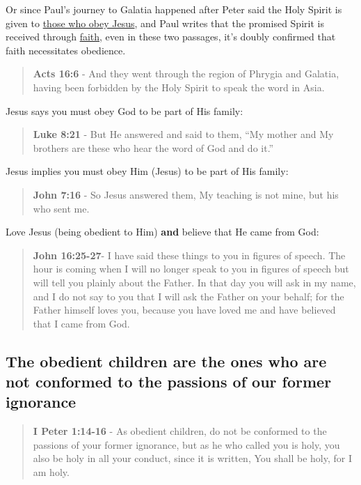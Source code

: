 \documentclass[11pt]{article}
\begin{document}
Or since Paul's journey to Galatia happened after Peter said the Holy Spirit is given to \uline{those who obey Jesus}, and Paul writes that the promised Spirit is received through \uline{faith}, even in these two passages, it's doubly confirmed that faith necessitates obedience.

\begin{quote}
\textbf{Acts 16:6} - And they went through the region of Phrygia and Galatia, having been forbidden by the Holy Spirit to speak the word in Asia.
\end{quote}

Jesus says you must obey God to be part of His family:

\begin{quote}
\textbf{Luke 8:21} - But He answered and said to them, “My mother and My brothers are these who hear the word of God and do it.”
\end{quote}

Jesus implies you must obey Him (Jesus) to be part of His family:

\begin{quote}
\textbf{John 7:16} - So Jesus answered them, My teaching is not mine, but his who sent me.
\end{quote}

Love Jesus (being obedient to Him) \textbf{and} believe that He came from God:

\begin{quote}
\textbf{John 16:25-27}- I have said these things to you in figures of speech. The hour is coming when I will no longer speak to you in figures of speech but will tell you plainly about the Father. In that day you will ask in my name, and I do not say to you that I will ask the Father on your behalf; for the Father himself loves you, because you have loved me and have believed that I came from God.
\end{quote}

\subsection{The obedient children are the ones who are not conformed to the passions of our former ignorance}
\label{sec:org264a6c0}
\begin{quote}
\textbf{I Peter 1:14-16} - As obedient children, do not be conformed to the passions of your former ignorance, but as he who called you is holy, you also be holy in all your conduct, since it is written, You shall be holy, for I am holy.
\end{quote}
\end{document}
